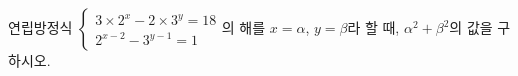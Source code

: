 연립방정식 $\begin{cases} 3\times 2^x-2\times 3^y=18 \\ 2^{x-2}-3^{y-1}=1 \end{cases}$의 해를 $x=\alpha$, $y=\beta$라 할 때, $\alpha^2+\beta^2$의 값을 구하시오.
